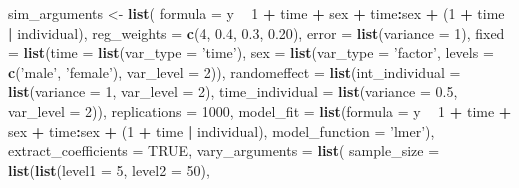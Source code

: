 \documentclass[man]{apa6}
\newenvironment{Shaded}{\begin{snugshade}}{\end{snugshade}}
\newcommand{\DataTypeTok}[1]{\textcolor[rgb]{0.13,0.29,0.53}{#1}}
\newcommand{\DecValTok}[1]{\textcolor[rgb]{0.00,0.00,0.81}{#1}}
\newcommand{\FloatTok}[1]{\textcolor[rgb]{0.00,0.00,0.81}{#1}}
\newcommand{\KeywordTok}[1]{\textcolor[rgb]{0.13,0.29,0.53}{\textbf{#1}}}
\newcommand{\NormalTok}[1]{#1}
\newcommand{\OperatorTok}[1]{\textcolor[rgb]{0.81,0.36,0.00}{\textbf{#1}}}
\newcommand{\OtherTok}[1]{\textcolor[rgb]{0.56,0.35,0.01}{#1}}
\newcommand{\StringTok}[1]{\textcolor[rgb]{0.31,0.60,0.02}{#1}}
\begin{document}
\begin{Shaded}
\begin{Highlighting}[]
\NormalTok{sim_arguments <-}\StringTok{ }\KeywordTok{list}\NormalTok{(}
  \DataTypeTok{formula =}\NormalTok{ y }\OperatorTok{~}\StringTok{ }\DecValTok{1} \OperatorTok{+}\StringTok{ }\NormalTok{time }\OperatorTok{+}\StringTok{ }\NormalTok{sex }\OperatorTok{+}\StringTok{ }\NormalTok{time}\OperatorTok{:}\NormalTok{sex }\OperatorTok{+}\StringTok{ }\NormalTok{(}\DecValTok{1} \OperatorTok{+}\StringTok{ }\NormalTok{time }\OperatorTok{|}\StringTok{ }\NormalTok{individual),}
  \DataTypeTok{reg_weights =} \KeywordTok{c}\NormalTok{(}\DecValTok{4}\NormalTok{, }\FloatTok{0.4}\NormalTok{, }\FloatTok{0.3}\NormalTok{, }\FloatTok{0.20}\NormalTok{),}
  \DataTypeTok{error =} \KeywordTok{list}\NormalTok{(}\DataTypeTok{variance =} \DecValTok{1}\NormalTok{),}
  \DataTypeTok{fixed =} \KeywordTok{list}\NormalTok{(}\DataTypeTok{time =} \KeywordTok{list}\NormalTok{(}\DataTypeTok{var_type =} \StringTok{'time'}\NormalTok{),}
               \DataTypeTok{sex =} \KeywordTok{list}\NormalTok{(}\DataTypeTok{var_type =} \StringTok{'factor'}\NormalTok{, }\DataTypeTok{levels =} \KeywordTok{c}\NormalTok{(}\StringTok{'male'}\NormalTok{, }\StringTok{'female'}\NormalTok{),}
                          \DataTypeTok{var_level =} \DecValTok{2}\NormalTok{)),}
  \DataTypeTok{randomeffect =} \KeywordTok{list}\NormalTok{(}\DataTypeTok{int_individual =} \KeywordTok{list}\NormalTok{(}\DataTypeTok{variance =} \DecValTok{1}\NormalTok{, }\DataTypeTok{var_level =} \DecValTok{2}\NormalTok{),}
                      \DataTypeTok{time_individual =} \KeywordTok{list}\NormalTok{(}\DataTypeTok{variance =} \FloatTok{0.5}\NormalTok{, }\DataTypeTok{var_level =} \DecValTok{2}\NormalTok{)),}
  \DataTypeTok{replications =} \DecValTok{1000}\NormalTok{,}
  \DataTypeTok{model_fit =} \KeywordTok{list}\NormalTok{(}\DataTypeTok{formula =}\NormalTok{ y }\OperatorTok{~}\StringTok{ }\DecValTok{1} \OperatorTok{+}\StringTok{ }\NormalTok{time }\OperatorTok{+}\StringTok{ }\NormalTok{sex }\OperatorTok{+}\StringTok{ }\NormalTok{time}\OperatorTok{:}\NormalTok{sex }\OperatorTok{+}\StringTok{ }
\StringTok{                     }\NormalTok{(}\DecValTok{1} \OperatorTok{+}\StringTok{ }\NormalTok{time }\OperatorTok{|}\StringTok{ }\NormalTok{individual), }
                   \DataTypeTok{model_function =} \StringTok{'lmer'}\NormalTok{),}
  \DataTypeTok{extract_coefficients =} \OtherTok{TRUE}\NormalTok{,}
  \DataTypeTok{vary_arguments =} \KeywordTok{list}\NormalTok{(}
    \DataTypeTok{sample_size =} \KeywordTok{list}\NormalTok{(}\KeywordTok{list}\NormalTok{(}\DataTypeTok{level1 =} \DecValTok{5}\NormalTok{, }\DataTypeTok{level2 =} \DecValTok{50}\NormalTok{),}

\end{Highlighting}
\end{Shaded}
\end{document}
